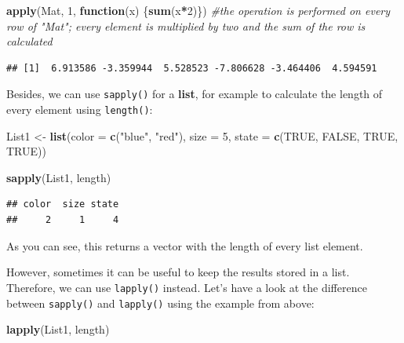\documentclass[
]{book}
\newenvironment{Shaded}{\begin{snugshade}}{\end{snugshade}}
\newcommand{\AttributeTok}[1]{\textcolor[rgb]{0.13,0.29,0.53}{#1}}
\newcommand{\CommentTok}[1]{\textcolor[rgb]{0.56,0.35,0.01}{\textit{#1}}}
\newcommand{\ConstantTok}[1]{\textcolor[rgb]{0.56,0.35,0.01}{#1}}
\newcommand{\ControlFlowTok}[1]{\textcolor[rgb]{0.13,0.29,0.53}{\textbf{#1}}}
\newcommand{\DecValTok}[1]{\textcolor[rgb]{0.00,0.00,0.81}{#1}}
\newcommand{\FunctionTok}[1]{\textcolor[rgb]{0.13,0.29,0.53}{\textbf{#1}}}
\newcommand{\NormalTok}[1]{#1}
\newcommand{\OtherTok}[1]{\textcolor[rgb]{0.56,0.35,0.01}{#1}}
\newcommand{\SpecialCharTok}[1]{\textcolor[rgb]{0.81,0.36,0.00}{\textbf{#1}}}
\newcommand{\StringTok}[1]{\textcolor[rgb]{0.31,0.60,0.02}{#1}}
\begin{document}
\begin{Shaded}
\begin{Highlighting}[]
\FunctionTok{apply}\NormalTok{(Mat, }\DecValTok{1}\NormalTok{, }\ControlFlowTok{function}\NormalTok{(x) \{}\FunctionTok{sum}\NormalTok{(x}\SpecialCharTok{*}\DecValTok{2}\NormalTok{)\}) }\CommentTok{\#the operation is performed on every row of "Mat"; every element is multiplied by two and the sum of the row is calculated}
\end{Highlighting}
\end{Shaded}

\begin{verbatim}
## [1]  6.913586 -3.359944  5.528523 -7.806628 -3.464406  4.594591
\end{verbatim}

Besides, we can use \texttt{sapply()} for a \textbf{list}, for example to calculate the length of every element using \texttt{length()}:

\begin{Shaded}
\begin{Highlighting}[]
\NormalTok{List1 }\OtherTok{\textless{}{-}} \FunctionTok{list}\NormalTok{(}\AttributeTok{color =} \FunctionTok{c}\NormalTok{(}\StringTok{"blue"}\NormalTok{, }\StringTok{"red"}\NormalTok{), }\AttributeTok{size =} \DecValTok{5}\NormalTok{, }\AttributeTok{state =} \FunctionTok{c}\NormalTok{(}\ConstantTok{TRUE}\NormalTok{, }\ConstantTok{FALSE}\NormalTok{, }\ConstantTok{TRUE}\NormalTok{, }\ConstantTok{TRUE}\NormalTok{))}

\FunctionTok{sapply}\NormalTok{(List1, length)}
\end{Highlighting}
\end{Shaded}

\begin{verbatim}
## color  size state 
##     2     1     4
\end{verbatim}

As you can see, this returns a vector with the length of every list element.

However, sometimes it can be useful to keep the results stored in a list.
Therefore, we can use \texttt{lapply()} instead.
Let's have a look at the difference between \texttt{sapply()} and \texttt{lapply()} using the example from above:

\begin{Shaded}
\begin{Highlighting}[]
\FunctionTok{lapply}\NormalTok{(List1, length)}
\end{Highlighting}
\end{Shaded}
\end{document}
